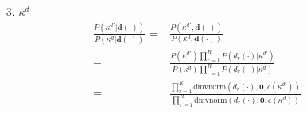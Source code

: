 \documentclass[a4paper]{article}
\begin{document}
\begin{itemize}
\begin{equation}
		\end{equation}
	\item [3.] $\kappa^d$
		\begin{equation}
		\begin{aligned}
		\frac{P(\kappa^{d\prime}|\boldsymbol{d}(\cdot))}{P(\kappa^d|\boldsymbol{d}(\cdot))}=&\frac{P(\kappa^{d\prime}, \boldsymbol{d}(\cdot))}{P( \kappa^d,\boldsymbol{d}(\cdot))}\\=&\frac{P(\kappa^{d\prime})\prod_{r=1}^R P(d_r(\cdot)|\kappa^{d\prime}) }{P(\kappa^{d})\prod_{r=1}^R P( d_r(\cdot)| \kappa^{d})}\\
			=&\frac{\prod_{r=1}^R \mbox{dmvnorm}( d_r(\cdot), \boldsymbol{0}, c(\kappa^{d\prime})) }{\prod_{r=1}^R \mbox{dmvnorm}( d_r(\cdot), \boldsymbol{0}, c(\kappa^{d}))}
		\end{aligned}
		\end{equation}
\end{itemize}
\end{document}
